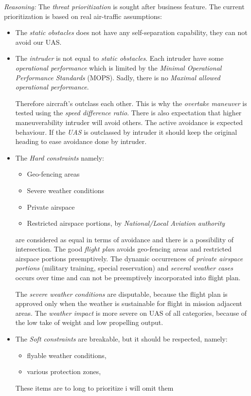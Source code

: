\documentclass[12pt, a4paper]{report}
\theoremstyle{plain}
\theoremstyle{plain}
\theoremstyle{remark}
\begin{document}
\noindent\emph{Reasoning:} The \emph{threat prioritization} is sought after business feature. The current prioritization is based on real air-traffic assumptions:
\begin{itemize}
    \item The \emph{static obstacles} does not have any self-separation capability, they can not avoid our UAS.
    
    \item The \emph{intruder} is not equal to \emph{static obstacles}. Each intruder have some \emph{operational performance} which is limited by the \emph{Minimal Operational Performance Standards} (MOPS). Sadly, there is no \emph{Maximal allowed operational performance}.
    
    Therefore aircraft's outclass each other. This is why the \emph{overtake maneuver} is tested using the \emph{speed difference ratio}. There is also expectation that higher maneuverability intruder will avoid others. The active avoidance is expected behaviour. If the \emph{UAS} is outclassed by intruder it should keep the original heading to ease avoidance done by intruder.
    
    \item The \emph{Hard constraints} namely:
    
    \begin{itemize}
        \item Geo-fencing areas 
        \item Severe weather conditions
        \item Private airspace
        \item Restricted airspace portions, by \emph{National/Local Aviation authority}
    \end{itemize}
    
    are considered as equal in terms of avoidance and there is a possibility of intersection. The good \emph{flight plan} avoids geo-fencing areas and restricted airspace portions preemptively. The dynamic occurrences of \emph{private airspace portions} (military training, special reservation) and \emph{several weather cases} occurs over time and can not be preemptively incorporated into flight plan.
    
    The \emph{severe weather conditions} are disputable, because the flight plan is approved only when the weather is sustainable for flight in mission adjacent areas. The \emph{weather impact} is more severe on UAS of all categories, because of the low take of weight and low propelling output. 
    
    \item The \emph{Soft constraints} are breakable, but it should be respected, namely:
    \begin{itemize}
        \item flyable weather conditions,
        \item various protection zones,
    \end{itemize}
    These items are to long to prioritize i will omit them
\end{itemize}
\end{document}
